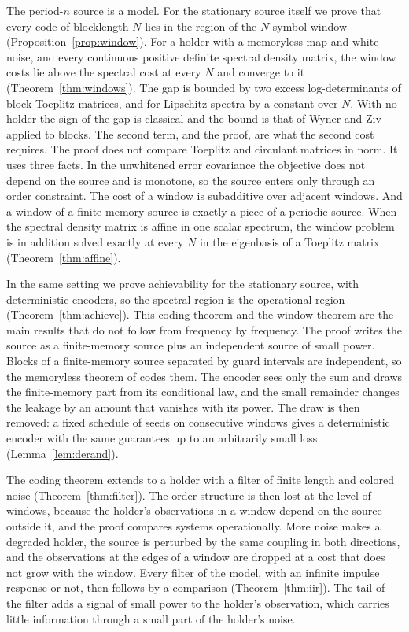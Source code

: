 \documentclass[11pt,onecolumn]{IEEEtran}
\begin{document}
The period-$n$ source is a model. For the stationary source itself we
prove that every code of blocklength $N$ lies in the region of the
$N$-symbol window (Proposition~\ref{prop:window}). For a holder with a
memoryless map and white noise, and every continuous positive definite
spectral density matrix, the window costs lie above the spectral cost
at every $N$ and converge to it (Theorem~\ref{thm:windows}). The gap
is bounded by two excess log-determinants of block-Toeplitz matrices,
and for Lipschitz spectra by a constant over $N$. With no holder the
sign of the gap is classical and the bound is that of Wyner and Ziv
\cite{wynerziv1971} applied to blocks. The second term, and the proof,
are what the second cost requires. The proof
does not compare Toeplitz and circulant matrices in norm. It uses three
facts. In the unwhitened error covariance the objective does not depend
on the source and is monotone, so the source enters only through an
order constraint. The cost of a window is subadditive over adjacent
windows. And a window of a finite-memory source is exactly a piece of a
periodic source. When the spectral density matrix is affine in one
scalar spectrum, the window problem is in addition solved exactly at
every $N$ in the eigenbasis of a Toeplitz matrix
(Theorem~\ref{thm:affine}).

In the same setting we prove achievability for the stationary source,
with deterministic encoders, so the spectral region is the operational
region (Theorem~\ref{thm:achieve}). This coding theorem and the window
theorem are the main results that do not follow from \cite{part1}
frequency by frequency. The
proof writes the source as a
finite-memory source plus an independent source of small power. Blocks
of a finite-memory source separated by guard intervals are independent,
so the memoryless theorem of \cite{part1} codes them. The encoder sees
only the sum and draws the finite-memory part from its conditional law,
and the small remainder changes the
leakage by an amount that vanishes with its power. The draw is then
removed: a fixed schedule of seeds on consecutive windows gives a
deterministic encoder with the same guarantees up to an arbitrarily
small loss (Lemma~\ref{lem:derand}).

The coding theorem extends to a holder with a filter of finite length
and colored noise (Theorem~\ref{thm:filter}). The order structure is
then lost at the level of windows, because the holder's observations in
a window depend on the source outside it, and the proof compares
systems operationally. More noise makes a degraded holder, the source
is perturbed by the same coupling in both directions, and the
observations at the edges of a window are dropped at a cost that does
not grow with the window. Every filter of the model, with an infinite
impulse response or not, then follows by a comparison
(Theorem~\ref{thm:iir}). The tail of the filter adds a signal of small
power to the holder's observation, which carries little information
through a small part of the holder's noise.
\end{document}
